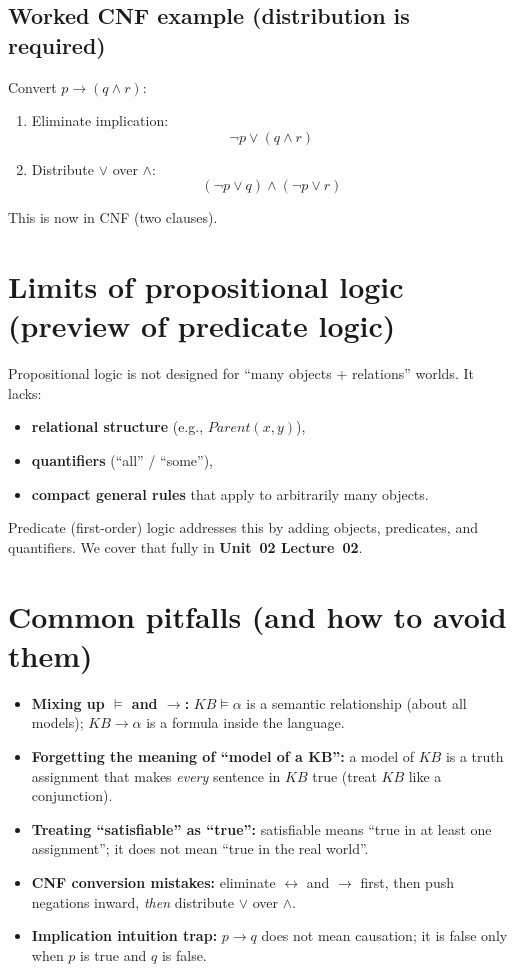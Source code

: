 \documentclass[11pt]{article}
\begin{document}
\subsection{Worked CNF example (distribution is required)}
Convert $p \rightarrow (q \land r)$:
\begin{enumerate}[leftmargin=*]
  \item Eliminate implication:
  \[
    \lnot p \lor (q \land r)
  \]
  \item Distribute $\lor$ over $\land$:
  \[
    (\lnot p \lor q) \land (\lnot p \lor r)
  \]
\end{enumerate}
This is now in CNF (two clauses).

\section{Limits of propositional logic (preview of predicate logic)}
Propositional logic is not designed for ``many objects + relations'' worlds.
It lacks:
\begin{itemize}[leftmargin=*]
  \item \textbf{relational structure} (e.g., $Parent(x,y)$),
  \item \textbf{quantifiers} (``all'' / ``some''),
  \item \textbf{compact general rules} that apply to arbitrarily many objects.
\end{itemize}
Predicate (first-order) logic addresses this by adding objects, predicates, and quantifiers.
We cover that fully in \textbf{Unit~02 Lecture~02}.

\section{Common pitfalls (and how to avoid them)}
\begin{itemize}[leftmargin=*]
  \item \textbf{Mixing up $\models$ and $\rightarrow$:} $KB \models \alpha$ is a semantic relationship (about all models); $KB \rightarrow \alpha$ is a formula inside the language.
  \item \textbf{Forgetting the meaning of ``model of a KB'':} a model of $KB$ is a truth assignment that makes \emph{every} sentence in $KB$ true (treat $KB$ like a conjunction).
  \item \textbf{Treating ``satisfiable'' as ``true'':} satisfiable means ``true in at least one assignment''; it does not mean ``true in the real world''.
  \item \textbf{CNF conversion mistakes:} eliminate $\leftrightarrow$ and $\rightarrow$ first, then push negations inward, \emph{then} distribute $\lor$ over $\land$.
  \item \textbf{Implication intuition trap:} $p\rightarrow q$ does not mean causation; it is false only when $p$ is true and $q$ is false.
\end{itemize}
\end{document}
